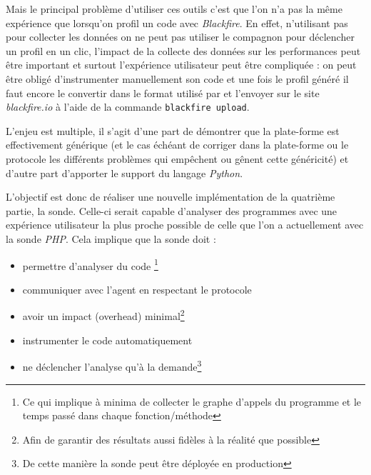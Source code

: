 Mais le principal problème d'utiliser ces outils c'est que l'on n'a pas la même expérience que lorsqu'on profil un code \PHP avec \emph{Blackfire}. En effet, n'utilisant pas \Blackfire pour collecter les données on ne peut pas utiliser le compagnon pour déclencher un profil en un clic, l'impact de la collecte des données sur les performances peut être important et surtout l'expérience utilisateur peut être compliquée : on peut être obligé d'instrumenter manuellement son code et une fois le profil généré il faut encore le convertir dans le format utilisé par \Blackfire et l'envoyer sur le site \emph{blackfire.io} à l'aide de la commande \verb|blackfire upload|.

L'enjeu est multiple, il s'agit d'une part de démontrer que la plate-forme \Blackfire est effectivement générique (et le cas échéant de corriger dans la plate-forme ou le protocole les différents problèmes qui empêchent ou gênent cette généricité) et d'autre part d'apporter le support du langage \emph{Python}.

L'objectif est donc de réaliser une nouvelle implémentation de la quatrième partie, la sonde. Celle-ci serait capable d'analyser des programmes \Python avec une expérience utilisateur la plus proche possible de celle que l'on a actuellement avec la sonde \emph{PHP}. Cela implique que la sonde doit :
\begin{itemize}
  \item permettre d'analyser du code \Python\footnote{Ce qui implique à minima de collecter le graphe d'appels du programme et le temps passé dans chaque fonction/méthode}
  \item communiquer avec l'agent en respectant le protocole
  \item avoir un impact (\gls{overhead}) minimal\footnote{Afin de garantir des résultats aussi fidèles à la réalité que possible}
  \item instrumenter le code automatiquement
  \item ne déclencher l'analyse qu'à la demande\footnote{De cette manière la sonde peut être déployée en production}
\end{itemize}

\setcounter{part}{0}
\setcounter{chapter}{0} 